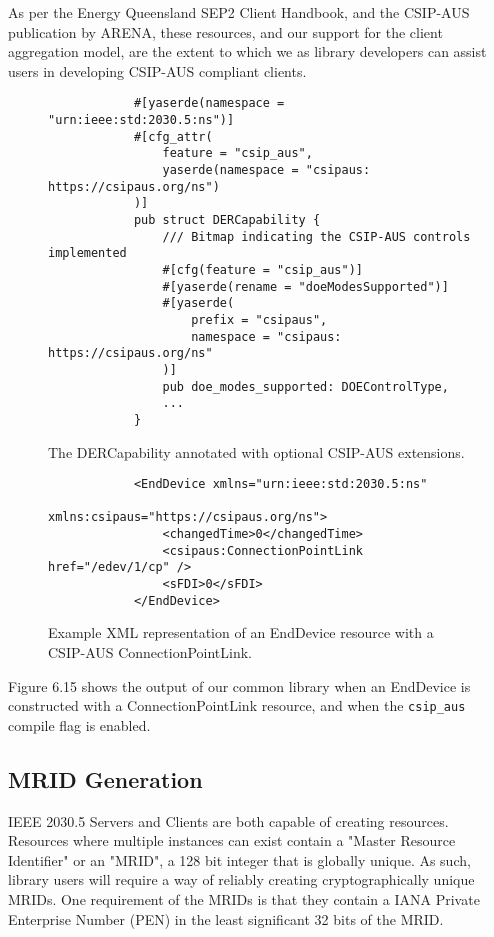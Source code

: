 As per the Energy Queensland SEP2 Client Handbook, and the CSIP-AUS publication by ARENA, these resources, and our support for the client aggregation model, are the extent to which we as library developers can assist users in developing CSIP-AUS compliant clients. \cite{sep2clienthandbook} \cite{CSIPAus}

\begin{figure}[H]
    \begin{center}
        \begin{lstlisting}
            #[yaserde(namespace = "urn:ieee:std:2030.5:ns")]
            #[cfg_attr(
                feature = "csip_aus",
                yaserde(namespace = "csipaus: https://csipaus.org/ns")
            )]
            pub struct DERCapability {
                /// Bitmap indicating the CSIP-AUS controls implemented
                #[cfg(feature = "csip_aus")]
                #[yaserde(rename = "doeModesSupported")]
                #[yaserde(
                    prefix = "csipaus", 
                    namespace = "csipaus: https://csipaus.org/ns"
                )]
                pub doe_modes_supported: DOEControlType,
                ...
            }
        \end{lstlisting}
        \label{fig:csipausimpl}
        \caption{The DERCapability annotated with optional CSIP-AUS extensions.}
    \end{center}
\end{figure}

\begin{figure}[H]
    \begin{center}
        \begin{lstlisting}
            <EndDevice xmlns="urn:ieee:std:2030.5:ns" 
                       xmlns:csipaus="https://csipaus.org/ns">
                <changedTime>0</changedTime>
                <csipaus:ConnectionPointLink  href="/edev/1/cp" />
                <sFDI>0</sFDI>
            </EndDevice>
        \end{lstlisting}
        \label{fig:enddeviceconnpointxml}
        \caption{Example XML representation of an EndDevice resource with a CSIP-AUS ConnectionPointLink.}
    \end{center}
\end{figure}

Figure 6.15 shows the output of our common library when an EndDevice is constructed with a ConnectionPointLink resource, and when the \texttt{csip\_aus} compile flag is enabled.


\subsection{MRID Generation}
IEEE 2030.5 Servers and Clients are both capable of creating resources. Resources where multiple instances can exist contain a "Master Resource Identifier" or an "MRID", a 128 bit integer that is globally unique.
As such, library users will require a way of reliably creating cryptographically unique MRIDs. One requirement of the MRIDs is that they contain a IANA Private Enterprise Number (PEN) in the least significant 32 bits of the MRID.

